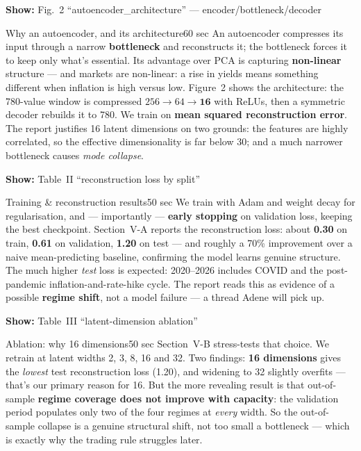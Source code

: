 \documentclass[11pt]{article}
\newcommand{\reportref}[1]{{\small\color{ink}\textbf{Show:} #1}}
\begin{document}
\begin{slide}\reportref{Fig.~2 ``autoencoder\_architecture'' --- encoder/bottleneck/decoder}\end{slide}
\begin{cue}{Why an autoencoder, and its architecture}{60 sec}
An autoencoder compresses its input through a narrow \textbf{bottleneck} and
reconstructs it; the bottleneck forces it to keep only what's essential. Its
advantage over PCA is capturing \textbf{non-linear} structure --- and markets are
non-linear: a rise in yields means something different when inflation is high
versus low. Figure~2 shows the architecture: the 780-value window is compressed
$256 \to 64 \to \textbf{16}$ with ReLUs, then a symmetric decoder rebuilds it to
780. We train on \textbf{mean squared reconstruction error}. The report justifies
16 latent dimensions on two grounds: the features are highly correlated, so the
effective dimensionality is far below 30; and a much narrower bottleneck causes
\emph{mode collapse}.
\end{cue}

\begin{slide}\reportref{Table~II ``reconstruction loss by split''}\end{slide}
\begin{cue}{Training \& reconstruction results}{50 sec}
We train with Adam and weight decay for regularisation, and --- importantly ---
\textbf{early stopping} on validation loss, keeping the best checkpoint. Section~V-A
reports the reconstruction loss: about \textbf{0.30} on train, \textbf{0.61} on
validation, \textbf{1.20} on test --- and roughly a 70\% improvement over a naive
mean-predicting baseline, confirming the model learns genuine structure. The much
higher \emph{test} loss is expected: 2020–2026 includes COVID and the post-pandemic
inflation-and-rate-hike cycle. The report reads this as evidence of a possible
\textbf{regime shift}, not a model failure --- a thread Adene will pick up.
\end{cue}

\begin{slide}\reportref{Table~III ``latent-dimension ablation''}\end{slide}
\begin{cue}{Ablation: why 16 dimensions}{50 sec}
Section~V-B stress-tests that choice. We retrain at latent widths 2, 3, 8, 16 and
32. Two findings: \textbf{16 dimensions} gives the \emph{lowest} test reconstruction
loss (1.20), and widening to 32 slightly overfits --- that's our primary reason for
16. But the more revealing result is that out-of-sample \textbf{regime coverage
does not improve with capacity}: the validation period populates only two of the
four regimes at \emph{every} width. So the out-of-sample collapse is a genuine
structural shift, not too small a bottleneck --- which is exactly why the trading
rule struggles later.
\end{cue}
\end{document}
